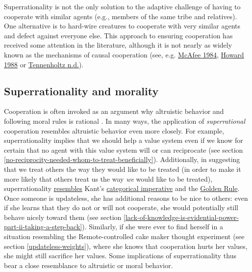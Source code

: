 Superrationality is not the only solution to the adaptive challenge of
having to cooperate with similar agents (e.g., members of the same tribe
and relatives). One alternative is to hard-wire creatures to cooperate
with very similar agents and defect against everyone else. This approach
to ensuring cooperation has received some attention in the literature,
although it is not nearly as widely known as the mechanisms of causal
cooperation (see, e.g.
\href{http://www.mcafee.cc/Papers/PDF/EffectiveComputability.pdf}{McAfee
1984},
\href{https://sl4librarian.files.wordpress.com/2016/12/howard1988.pdf}{Howard
1988} or
\href{https://ie.technion.ac.il/~moshet/progeqnote4.pdf}{Tennenholtz
n.d.}).

\hypertarget{superrationality-and-morality}{\subsection{Superrationality
and morality}\label{superrationality-and-morality}}

Cooperation is often invoked as an argument why altruistic behavior and
following moral rules is rational
\parencite{Dawkins1976-cd,Greene2013-sq}. In many ways, the
application of \emph{superrational} cooperation resembles altruistic
behavior even more closely. For example, superrationality implies that
we should help a value system even if we know for certain that no agent
with this value system will or can reciprocate (see section
\ref{no-reciprocity-needed-whom-to-treat-beneficially}). Additionally, in
suggesting that we treat others the way they would like to be treated
(in order to make it more likely that others treat us the way \emph{we}
would like to be treated), superrationality
\href{http://briantomasik.com/interpreting-the-categorical-imperative/\#Categorical_imperative_as_decision_theory}{resembles}
Kant's
\href{https://en.wikipedia.org/wiki/Categorical_imperative}{categorical
imperative} and the
\href{https://en.wikipedia.org/wiki/Golden_Rule}{Golden Rule}.
Once someone is updateless, she has additional reasons to be nice to
others: even if she learns that they do not or will not cooperate, she
would potentially still behave nicely toward them (see section
\ref{lack-of-knowledge-is-evidential-power-part-ii-taking-a-step-back}).
Similarly, if she were ever to find herself in a situation resembling
the Remote-controlled cake maker thought experiment (see section
\ref{updateless-weights}),
where she knows that cooperation hurts her values, she might still
sacrifice her values. Some implications of superrationality thus bear a
close resemblance to altruistic or moral behavior.

